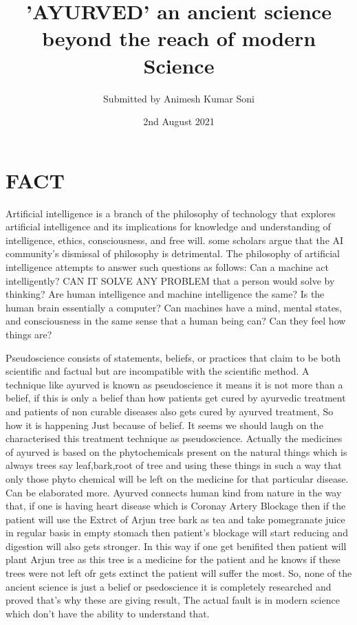 \documentclass[a4paper]{article}
\title{'AYURVED' an ancient science beyond the reach of modern Science}
\author{Submitted by Animesh Kumar Soni}
\date{2nd August 2021}
\begin{document}
\maketitle

\section{FACT}
Artificial intelligence is a branch of the philosophy of technology that explores artificial intelligence and its implications for knowledge and understanding of intelligence, ethics, consciousness, and free will. some scholars argue that the AI community’s dismissal of philosophy is detrimental. The philosophy of artificial intelligence attempts to answer such questions as follows: Can a machine act intelligently? CAN IT SOLVE ANY PROBLEM that a person would solve by thinking? Are human intelligence and machine intelligence the same?
Is the human brain essentially a computer? Can machines have a mind, mental states, and consciousness in the same sense that a human being can? Can they feel how things are?

Pseudoscience consists of statements, beliefs, or practices that claim to be both scientific and factual but are incompatible with the scientific method.
A technique like ayurved is known as pseudoscience it means it is not more than a belief, if this is only a belief than how patients get cured by ayurvedic treatment and patients of non curable diseases also gets cured by ayurved treatment, So how it is happening Just because of belief. It seems we should laugh on the characterised this treatment technique as pseudoscience.
Actually the medicines of ayurved is based on the phytochemicals present on the natural things which is always trees say leaf,bark,root of tree and using these things in such a way that only those phyto chemical will be left on the medicine for that particular disease. Can be elaborated more.
Ayurved connects human kind from nature in the way that, if one is having heart disease which is Coronay Artery Blockage then if the patient will use the Extrct of Arjun tree bark as tea and take pomegranate juice in regular basis in empty stomach then patient's blockage will start reducing and digestion will also gets stronger. In this way if one get benifited then patient will plant Arjun tree as this tree is a medicine for the patient and he knows if these trees were not left ofr gets extinct the patient will suffer the most.
So, none of the ancient science is just a belief or psedoscience it is completely researched and proved that's why these are giving result, The actual fault is in modern science which don't have the ability to understand that.     
\end{document}
